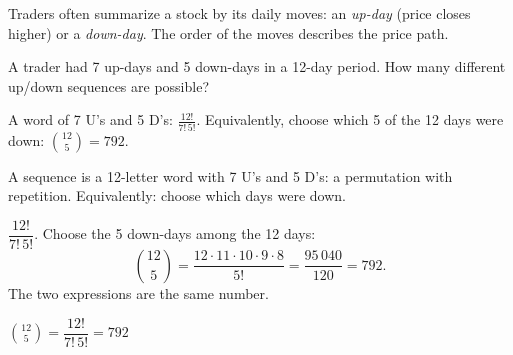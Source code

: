 
\begin{problem}
	\begin{context}
		Traders often summarize a stock by its daily moves: an
		\emph{up-day} (price closes higher) or a \emph{down-day}. The order of the
		moves describes the price path.
	\end{context}
	A trader had 7 up-days and 5 down-days in a 12-day period. How many
	different up/down sequences are possible?
\end{problem}

\begin{slides}
	\small
	\exstatement
	\pause
	\sol A word of 7 U's and 5 D's: $\frac{12!}{7!\,5!}$. Equivalently,
	choose which 5 of the 12 days were down: $\binom{12}{5} = 792$.
\end{slides}

\begin{solution}
	\idea A sequence is a 12-letter word with 7 U's and 5 D's: a permutation
	with repetition. Equivalently: choose which days were down.

	 $\dfrac{12!}{7!\,5!}$.
	 Choose the 5 down-days among the 12 days:
	\[ \binom{12}{5}=\frac{12\cdot11\cdot10\cdot9\cdot8}{5!}=\frac{95\,040}{120}=792. \]
	The two expressions are the same number.
	\begin{answer}
		$\binom{12}{5}=\dfrac{12!}{7!\,5!}=792$
	\end{answer}
\end{solution}
